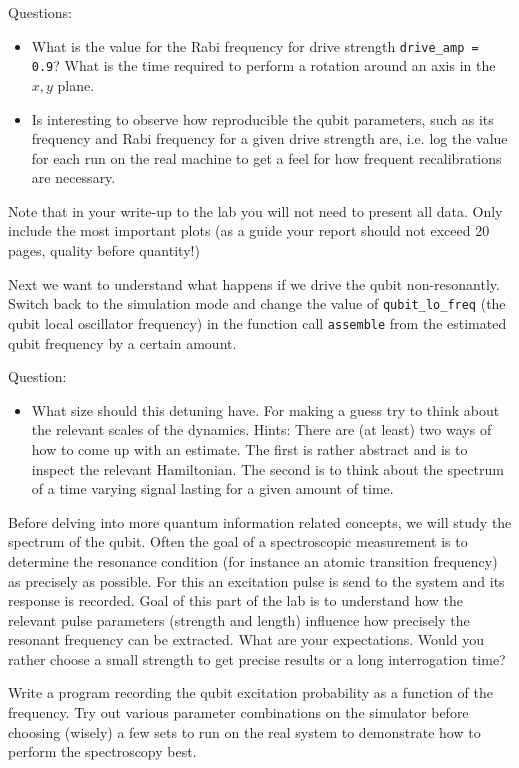 \documentclass{../lab}
\begin{document}
Questions:
\begin{itemize}\item
What is the value for the Rabi frequency for drive strength \verb|drive_amp = 0.9|? What is the time required to perform a rotation around an axis in the $x,y$ plane. 
\item Is interesting to observe how reproducible the qubit parameters, such as its frequency and Rabi frequency for a given drive strength are, i.e. log the value for each run on the real machine to get a feel for how frequent recalibrations are necessary. 
\end{itemize}
Note that in your write-up to the lab you will not need to present all data. Only include the most important plots (as a guide your report should not exceed 20 pages, quality before quantity!)


Next we want to understand what happens if we drive the qubit non-resonantly. Switch back to the simulation mode and change the value of \verb|qubit_lo_freq| (the qubit local oscillator frequency) in the function call \verb|assemble| from the estimated qubit frequency by a certain amount. 

Question:
\begin{itemize}
    \item What size should this detuning have. For making a guess try to think about the relevant scales of the dynamics. Hints: There are (at least) two ways of how to come up with an estimate. The first is rather abstract and is to inspect the relevant Hamiltonian. The second is to think about the spectrum of a time varying signal lasting for a given amount of time.  
\end{itemize}

Before delving into more quantum information related concepts, we will study the spectrum of the qubit. Often the goal of a spectroscopic measurement is to determine the resonance condition (for instance an atomic transition frequency) as precisely as possible. For this an excitation pulse is send to the system and its response is recorded. Goal of this part of the lab is to understand how the relevant pulse parameters (strength and length) influence how precisely the resonant frequency can be extracted. What are your expectations. Would you rather choose a small strength to get precise results or a long interrogation time?

Write a program recording the qubit excitation probability as a function of the frequency. Try out various parameter combinations on the simulator before choosing (wisely) a few sets to run on the real system to demonstrate how to perform the spectroscopy best. 
\end{document}
